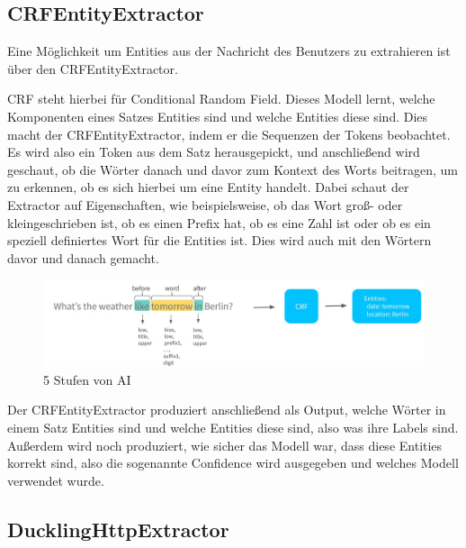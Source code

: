 \subsection{CRFEntityExtractor}

Eine Möglichkeit um Entities aus der Nachricht des Benutzers zu extrahieren ist über den CRFEntityExtractor.\cite{crfEntityExtractor}

CRF steht hierbei für Conditional Random Field.
Dieses Modell lernt, welche Komponenten eines Satzes Entities sind und welche Entities diese sind.\cite{crfEntityExtractor, pipelineComponentsYoutube, regexFeaturizerCrf}
\ci
Dies macht der CRFEntityExtractor, indem er die Sequenzen der Tokens beobachtet.
Es wird also ein Token aus dem Satz herausgepickt, und anschließend wird geschaut, ob die Wörter danach und davor zum Kontext des Worts beitragen, um zu erkennen, ob es sich hierbei um eine Entity handelt.
Dabei schaut der Extractor auf Eigenschaften, wie beispielsweise, ob das Wort groß- oder kleingeschrieben ist, ob es einen Prefix hat, ob es eine Zahl ist oder ob es ein speziell definiertes Wort für die Entities ist.
Dies wird auch mit den Wörtern davor und danach gemacht.\cite{crfEntityExtractor, pipelineComponentsYoutube, regexFeaturizerCrf}

\begin{figure}
  \centering
  \includegraphics[scale=0.25]{pics/crf-entity-extractor}
  \caption{5 Stufen von AI~\cite{pipelineComponentsYoutube}}
  \label{fig:CRFEntityExtractor}
\end{figure}

Der CRFEntityExtractor produziert anschließend als Output, welche Wörter in einem Satz Entities sind und welche Entities diese sind, also was ihre Labels sind.
Außerdem wird noch produziert, wie sicher das Modell war, dass diese Entities korrekt sind, also die sogenannte Confidence wird ausgegeben und welches Modell verwendet wurde.\cite{crfEntityExtractor, pipelineComponentsYoutube, regexFeaturizerCrf}

\subsection{DucklingHttpExtractor}

